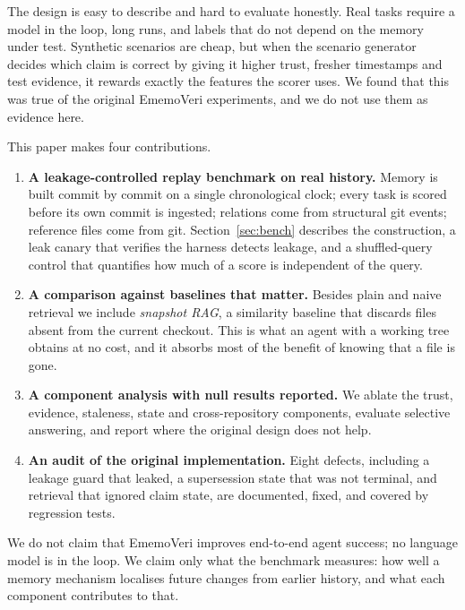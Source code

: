 \documentclass[11pt,a4paper]{article}
\newcommand{\sys}{EmemoVeri}
\begin{document}
The design is easy to describe and hard to evaluate honestly. Real tasks require a model in the loop, long runs, and labels that do not depend on the memory under test. Synthetic scenarios are cheap, but when the scenario generator decides which claim is correct by giving it higher trust, fresher timestamps and test evidence, it rewards exactly the features the scorer uses. We found that this was true of the original \sys{} experiments, and we do not use them as evidence here.

This paper makes four contributions.
\begin{enumerate}
\item \textbf{A leakage-controlled replay benchmark on real history.} Memory is built commit by commit on a single chronological clock; every task is scored before its own commit is ingested; relations come from structural git events; reference files come from git. Section~\ref{sec:bench} describes the construction, a leak canary that verifies the harness detects leakage, and a shuffled-query control that quantifies how much of a score is independent of the query.
\item \textbf{A comparison against baselines that matter.} Besides plain and naive retrieval we include \emph{snapshot RAG}, a similarity baseline that discards files absent from the current checkout. This is what an agent with a working tree obtains at no cost, and it absorbs most of the benefit of knowing that a file is gone.
\item \textbf{A component analysis with null results reported.} We ablate the trust, evidence, staleness, state and cross-repository components, evaluate selective answering, and report where the original design does not help.
\item \textbf{An audit of the original implementation.} Eight defects, including a leakage guard that leaked, a supersession state that was not terminal, and retrieval that ignored claim state, are documented, fixed, and covered by regression tests.
\end{enumerate}
We do not claim that \sys{} improves end-to-end agent success; no language model is in the loop. We claim only what the benchmark measures: how well a memory mechanism localises future changes from earlier history, and what each component contributes to that.
\end{document}
